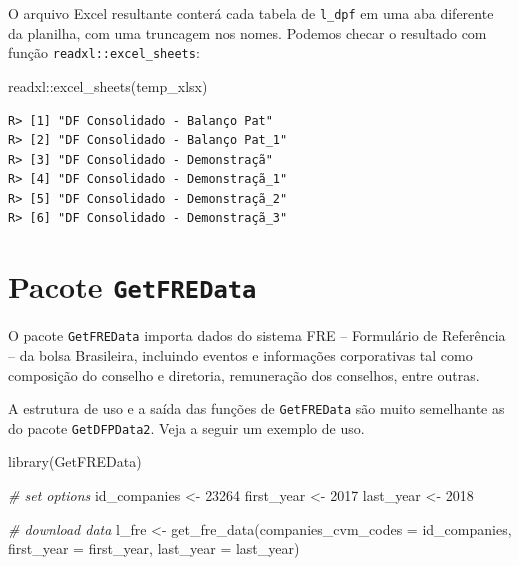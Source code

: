 \documentclass[
  11pt,
]{book}
\newenvironment{Shaded}{\begin{snugshade}}{\end{snugshade}}
\newcommand{\AttributeTok}[1]{\textcolor[rgb]{0.61,0.61,0.61}{#1}}
\newcommand{\CommentTok}[1]{\textcolor[rgb]{0.37,0.37,0.37}{\textit{#1}}}
\newcommand{\DecValTok}[1]{\textcolor[rgb]{0.06,0.06,0.06}{#1}}
\newcommand{\FunctionTok}[1]{\textcolor[rgb]{0,0,0}{#1}}
\newcommand{\NormalTok}[1]{#1}
\newcommand{\OtherTok}[1]{\textcolor[rgb]{0.37,0.37,0.37}{#1}}
\newcommand{\SpecialCharTok}[1]{\textcolor[rgb]{0,0,0}{#1}}
\begin{document}
O arquivo Excel resultante conterá cada tabela de \texttt{l\_dpf} em uma aba diferente da planilha, com uma truncagem nos nomes. Podemos checar o resultado com função \texttt{readxl::excel\_sheets}:

\begin{Shaded}
\begin{Highlighting}[]
\NormalTok{readxl}\SpecialCharTok{::}\FunctionTok{excel\_sheets}\NormalTok{(temp\_xlsx)}
\end{Highlighting}
\end{Shaded}

\begin{verbatim}
R> [1] "DF Consolidado - Balanço Pat"  
R> [2] "DF Consolidado - Balanço Pat_1"
R> [3] "DF Consolidado - Demonstraçã"  
R> [4] "DF Consolidado - Demonstraçã_1"
R> [5] "DF Consolidado - Demonstraçã_2"
R> [6] "DF Consolidado - Demonstraçã_3"
\end{verbatim}

\hypertarget{pacote-getfredata}{%
\section{\texorpdfstring{Pacote \texttt{GetFREData}}{Pacote GetFREData}}\label{pacote-getfredata}}

O pacote \texttt{GetFREData} importa dados do sistema FRE -- Formulário de Referência -- da bolsa Brasileira, incluindo eventos e informações corporativas tal como composição do conselho e diretoria, remuneração dos conselhos, entre outras.

A estrutura de uso e a saída das funções de \texttt{GetFREData} são muito semelhante as do pacote \texttt{GetDFPData2}. Veja a seguir um exemplo de uso.

\begin{Shaded}
\begin{Highlighting}[]
\FunctionTok{library}\NormalTok{(GetFREData)}

\CommentTok{\# set options}
\NormalTok{id\_companies }\OtherTok{\textless{}{-}} \DecValTok{23264}
\NormalTok{first\_year }\OtherTok{\textless{}{-}} \DecValTok{2017}
\NormalTok{last\_year  }\OtherTok{\textless{}{-}} \DecValTok{2018}

\CommentTok{\# download data}
\NormalTok{l\_fre }\OtherTok{\textless{}{-}} \FunctionTok{get\_fre\_data}\NormalTok{(}\AttributeTok{companies\_cvm\_codes =}\NormalTok{ id\_companies,}
                      \AttributeTok{first\_year =}\NormalTok{ first\_year,}
                      \AttributeTok{last\_year =}\NormalTok{ last\_year)}
\end{Highlighting}
\end{Shaded}
\end{document}
